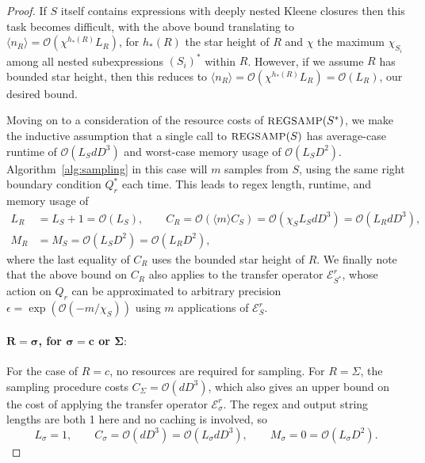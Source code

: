\documentclass[twoside]{article}
\newcommand{\Sample}{\textsc{\small REGSAMP}}
\newcommand{\bigO}{\mc{O}}
\newcommand{\ER}{\mc{E}^{\scriptstyle r}}
\newcommand{\QR}{Q_{r}}
\newcommand{\mc}[1]{\mathcal{#1}}
\begin{document}
\begin{proof}
If $S$ itself contains expressions with deeply nested Kleene closures then this task becomes difficult, with the above bound translating to $\langle n_R \rangle = \bigO(\chi^{h_*(R)} L_R)$, for $h_*(R)$ the star height of $R$ and $\chi$ the maximum $\chi_{S_i}$ among all nested subexpressions $(S_i)^*$ within $R$. However, if we assume $R$ has bounded star height, then this reduces to $\langle n_R \rangle = \bigO(\chi^{h_*(R)} L_R) = \bigO(L_R)$, our desired bound.

Moving on to a consideration of the resource costs of $\Sample(S^*)$, we make the inductive assumption that a single call to $\Sample(S)$ has average-case runtime of $\bigO(L_S d D^3)$ and worst-case memory usage of $\bigO(L_S D^2)$. Algorithm~\ref{alg:sampling} 
in this case will $m$ samples from $S$, using the same right boundary condition $\QR^*$ each time. This leads to regex length, runtime, and memory usage of
%
\begin{align*}
    L_R &= L_S + 1 = \bigO(L_S), \qquad C_R = \bigO(\langle m \rangle C_S) = \bigO(\chi_S L_S d D^3) = \bigO(L_R d D^3), \\
    M_R &= M_S = \bigO(L_S D^2) = \bigO(L_R D^2),
\end{align*}
%
where the last equality of $C_R$ uses the bounded star height of $R$. We finally note that the above bound on $C_R$ also applies to the transfer operator $\ER_{S^*}$, whose action on $\QR$ can be approximated to arbitrary precision $\epsilon = \exp(\bigO(-m / \chi_S))$ using $m$ applications of $\ER_S$.

\paragraph{$\mathbf{R = \sigma}$\textbf{, for }$\mathbf{\sigma=c}$\textbf{ or }$\mathbf{\Sigma:}$} For the case of $R = c$, no resources are required for sampling. For $R = \Sigma$, the sampling procedure costs $C_\Sigma = \bigO(d D^3)$, which also gives an upper bound on the cost of applying the transfer operator $\ER_\sigma$. The regex and output string lengths are both 1 here and no caching is involved, so
%
\begin{equation*}
    L_\sigma = 1, \qquad C_\sigma = \bigO(d D^3) = \bigO(L_\sigma d D^3), \qquad M_\sigma = 0 = \bigO(L_\sigma D^2).
\end{equation*}
%

\end{proof}
\end{document}
